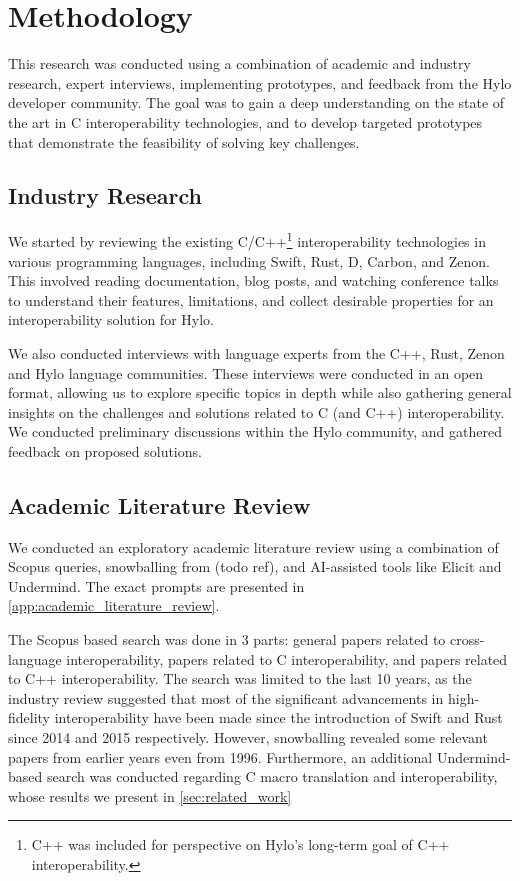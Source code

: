 \section{Methodology}
\label{sec:methodology}
This research was conducted using a combination of academic and industry research, expert interviews, implementing prototypes, and feedback from the Hylo developer community. The goal was to gain a deep understanding on the state of the art in C interoperability technologies, and to develop targeted prototypes that demonstrate the feasibility of solving key challenges. 

\subsection{Industry Research}
We started by reviewing the existing C/C++\footnote{C++ was included for perspective on Hylo's long-term goal of C++ interoperability.} interoperability technologies in various programming languages, including Swift, Rust, D, Carbon, and Zenon. This involved reading documentation, blog posts, and watching conference talks to understand their features, limitations, and collect desirable properties for an interoperability solution for Hylo.

We also conducted interviews with language experts from the C++, Rust, Zenon and Hylo language communities. These interviews were conducted in an open format, allowing us to explore specific topics in depth while also gathering general insights on the challenges and solutions related to C (and C++) interoperability. We conducted preliminary discussions within the Hylo community, and gathered feedback on proposed solutions.

\subsection{Academic Literature Review}
We conducted an exploratory academic literature review using a combination of Scopus queries, snowballing from (todo ref), and AI-assisted tools like Elicit and Undermind. The exact prompts are presented in \autoref{app:academic_literature_review}.

The Scopus based search was done in 3 parts: general papers related to cross-language interoperability, papers related to C interoperability, and papers related to C++ interoperability. The search was limited to the last 10 years, as the industry review suggested that most of the significant advancements in high-fidelity interoperability have been made since the introduction of Swift and Rust since 2014 and 2015 respectively. However, snowballing revealed some relevant papers from earlier years even from 1996. Furthermore, an additional Undermind-based search was conducted regarding C macro translation and interoperability, whose results we present in \autoref{sec:related_work}

